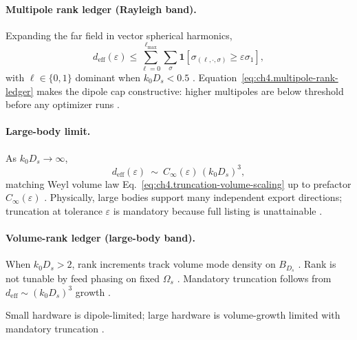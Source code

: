 \paragraph{Multipole rank ledger (Rayleigh band).}
Expanding the far field in vector spherical harmonics,
\begin{equation}
\label{eq:ch4.multipole-rank-ledger}
d_{\mathrm{eff}}(\varepsilon)\le\sum_{\ell=0}^{\ell_{\max}}\sum_{\sigma}\mathbf{1}\!\left[\sigma_{(\ell,\cdot,\sigma)}\ge\varepsilon\sigma_{1}\right],
\end{equation}
with \(\ell\in\{0,1\}\) dominant when \(k_{0}D_{s}<0.5\) \cite{jackson1999,stratton1941,hansen1988}. Equation~\eqref{eq:ch4.multipole-rank-ledger}
makes the dipole cap constructive: higher multipoles are below threshold before any optimizer runs \cite{harrington2001,devaney2004}.

\paragraph{Large-body limit.}
As \(k_{0}D_{s}\to\infty\),
\begin{equation}
\label{eq:ch4.large-body-rank-growth}
d_{\mathrm{eff}}(\varepsilon)\ \sim\ C_{\infty}(\varepsilon)\,(k_{0}D_{s})^{3},
\end{equation}
matching Weyl volume law Eq.~\eqref{eq:ch4.truncation-volume-scaling} up to prefactor \(C_{\infty}(\varepsilon)\) \cite{stratton1941,jackson1999,hansen1988}.
Physically, large bodies support many independent export directions; truncation at tolerance \(\varepsilon\) is mandatory because full listing is
unattainable \cite{harrington2001,devaney2004}.

\paragraph{Volume-rank ledger (large-body band).}
When \(k_{0}D_{s}>2\), rank increments track volume mode density on \(B_{D_{s}}\) \cite{stratton1941,jackson1999,hansen1988}. Rank is not tunable by
feed phasing on fixed \(\Omega_{s}\) \cite{devaney2004,harrington2001}. Mandatory truncation follows from
\(d_{\mathrm{eff}}\sim(k_{0}D_{s})^{3}\) growth \cite{hansen1988}.

\begin{corollary}
\label{cor:ch4.asymptotic-regimes}
Small hardware is dipole-limited; large hardware is volume-growth limited with mandatory truncation \cite{stratton1941,jackson1999,hansen1988,harrington2001,devaney2004}.
\end{corollary}

